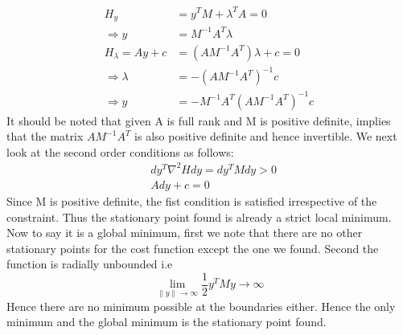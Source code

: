 \begin{enumerate}
\begin{enumerate}
   \begin{align*}
    H_{y} &= y^T M + \lambda^T A = 0\\
    \Rightarrow y &= M^{-1} A^T \lambda\\
    H_{\lambda} = A y + c &= (A M^{-1} A^T) \lambda + c = 0\\
    \Rightarrow \lambda &= -(A M^{-1} A^T)^{-1} c\\
    \Rightarrow y &= -M^{-1} A^T (A M^{-1} A^T)^{-1} c
   \end{align*}
   It should be noted that given A is full rank and M is positive definite, implies that the matrix $A M^{-1} A^T$ is also positive definite and hence invertible. We next look at the second order conditions as follows:
   \begin{align*}
   &dy^T \nabla^2 H dy = dy^T M dy > 0\\
   & Ady + c = 0
   \end{align*}
   Since M is positive definite, the fist condition is satisfied irrespective of the constraint. Thus the stationary point found is already a strict local minimum. Now to say it is a global minimum, first we note that there are no other stationary points for the cost function except the one we found. Second the function is radially unbounded i.e 
   \begin{equation*}
    \displaystyle\lim_{\|y\| \to \infty} \frac{1}{2} y^T M y \to \infty
   \end{equation*}
   Hence there are no minimum possible at the boundaries either. Hence the only minimum and the global minimum is the stationary point found.


\end{enumerate}
\end{enumerate}
